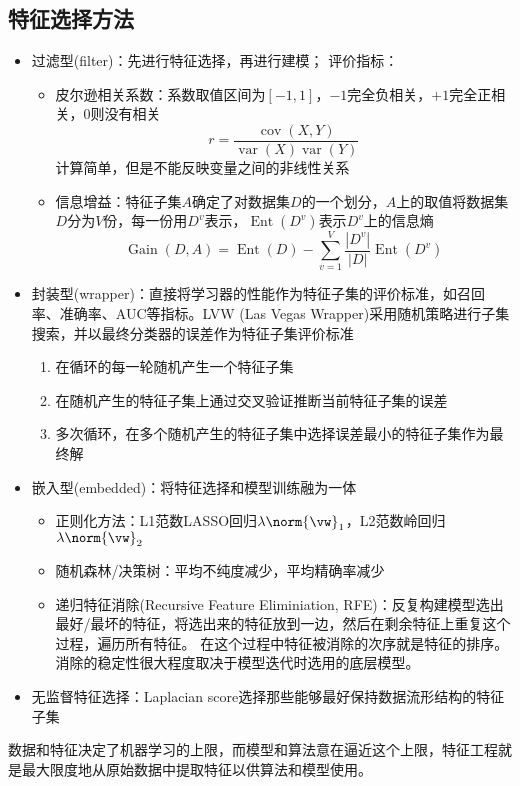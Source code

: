 \subsection{特征选择方法}
\begin{itemize}
	\item 过滤型(filter)：先进行特征选择，再进行建模；
	评价指标：
	\begin{itemize}
		\item 皮尔逊相关系数：系数取值区间为$[-1,1]$，$-1$完全负相关，$+1$完全正相关，$0$则没有相关
		\[r=\frac{\mathop{cov}(X,Y)}{\mathop{var}(X)\mathop{var}(Y)}\]
		计算简单，但是不能反映变量之间的非线性关系
		\item 信息增益：特征子集$A$确定了对数据集$D$的一个划分，$A$上的取值将数据集$D$分为$V$份，每一份用$D^v$表示，$\mathop{Ent}(D^v)$表示$D^v$上的信息熵
		\[\mathop{Gain}(D,A)=\mathop{Ent}(D)-\sum_{v=1}^V\frac{|D^v|}{|D|}\mathop{Ent}(D^v)\]
	\end{itemize}
	\item 封装型(wrapper)：直接将学习器的性能作为特征子集的评价标准，如召回率、准确率、AUC等指标。LVW (Las Vegas Wrapper)采用随机策略进行子集搜索，并以最终分类器的误差作为特征子集评价标准
	\begin{enumerate}
		\item 在循环的每一轮随机产生一个特征子集
		\item 在随机产生的特征子集上通过交叉验证推断当前特征子集的误差
		\item 多次循环，在多个随机产生的特征子集中选择误差最小的特征子集作为最终解
	\end{enumerate}
	\item 嵌入型(embedded)：将特征选择和模型训练融为一体
	\begin{itemize}
		\item 正则化方法：L1范数LASSO回归$\lambda\norm{\vw}_1$，L2范数岭回归$\lambda\norm{\vw}_2$
		\item 随机森林/决策树：平均不纯度减少，平均精确率减少
		\item 递归特征消除(Recursive Feature Eliminiation, RFE)：反复构建模型选出最好/最坏的特征，将选出来的特征放到一边，然后在剩余特征上重复这个过程，遍历所有特征。
		在这个过程中特征被消除的次序就是特征的排序。
		消除的稳定性很大程度取决于模型迭代时选用的底层模型。
	\end{itemize}
	\item 无监督特征选择：Laplacian score选择那些能够最好保持数据流形结构的特征子集
\end{itemize}

数据和特征决定了机器学习的上限，而模型和算法意在逼近这个上限，特征工程就是最大限度地从原始数据中提取特征以供算法和模型使用。
